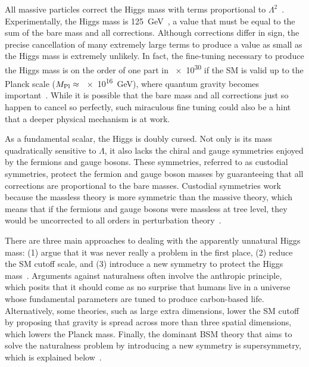 \documentclass[12pt]{article}
\begin{document}
    All massive particles correct the Higgs mass with terms proportional to $\Lambda^2$~\cite{dine_naturalness}. Experimentally, the Higgs mass is \SI{125}{\giga\electronvolt}~\cite{cms_higgs, atlas_higgs}, a value that must be equal to the sum of the bare mass and all corrections. Although corrections differ in sign, the precise cancellation of many extremely large terms to produce a value as small as the Higgs mass is extremely unlikely. In fact, the fine-tuning necessary to produce the Higgs mass is on the order of one part in \num{e30} if the SM is valid up to the Planck scale ($M_{\mathrm{Pl}}\approx$ \SI{e16}{\giga\electronvolt}), where quantum gravity becomes important~\cite{giudice_naturally}. While it is possible that the bare mass and all corrections just so happen to cancel so perfectly, such miraculous fine tuning could also be a hint that a deeper physical mechanism is at work.

    As a fundamental scalar, the Higgs is doubly cursed. Not only is its mass quadratically sensitive to $\Lambda$, it also lacks the chiral and gauge symmetries enjoyed by the fermions and gauge bosons. These symmetries, referred to as custodial symmetries, protect the fermion and gauge boson masses by guaranteeing that all corrections are proportional to the bare masses. Custodial symmetries work because the massless theory is more symmetric than the massive theory, which means that if the fermions and gauge bosons were massless at tree level, they would be uncorrected to all orders in perturbation theory~\cite{giudice_naturally}.

    There are three main approaches to dealing with the apparently unnatural Higgs mass: (1) argue that it was never really a problem in the first place, (2) reduce the SM cutoff scale, and (3) introduce a new symmetry to protect the Higgs mass~\cite{craig}. Arguments against naturalness often involve the anthropic principle, which posits that it should come as no surprise that humans live in a universe whose fundamental parameters are tuned to produce carbon-based life. Alternatively, some theories, such as large extra dimensions, lower the SM cutoff by proposing that gravity is spread across more than three spatial dimensions, which lowers the Planck mass. Finally, the dominant BSM theory that aims to solve the naturalness problem by introducing a new symmetry is supersymmetry, which is explained below~\cite{dine_naturalness}.
    
\end{document}
